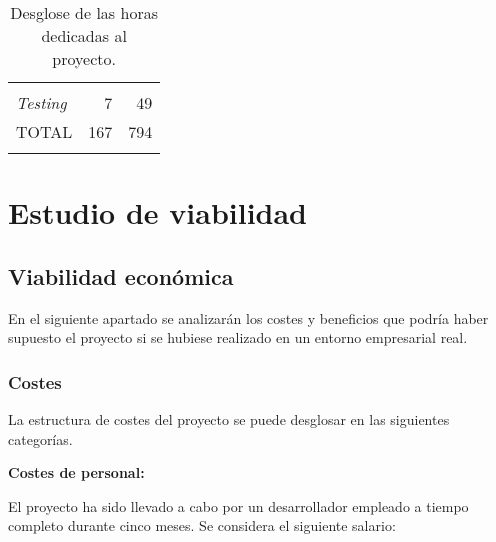 \begin{longtable}[]{@{}lrr@{}}
\begin{minipage}[t]{0.19\columnwidth}
\end{minipage}\tabularnewline
\begin{minipage}[t]{0.37\columnwidth}\raggedright\strut
\emph{Testing}\strut
\end{minipage} & \begin{minipage}[t]{0.19\columnwidth}\raggedright\strut
7\strut
\end{minipage} & \begin{minipage}[t]{0.19\columnwidth}\raggedright\strut
49\strut
\end{minipage}\tabularnewline
\midrule
\begin{minipage}[t]{0.37\columnwidth}\raggedright\strut
TOTAL\strut
\end{minipage} & \begin{minipage}[t]{0.19\columnwidth}\raggedright\strut
167\strut
\end{minipage} & \begin{minipage}[t]{0.19\columnwidth}\raggedright\strut
794\strut
\end{minipage}\tabularnewline
\bottomrule
\caption{Desglose de las horas dedicadas al proyecto.}
\end{longtable}

\newpage
\section{Estudio de viabilidad}\label{estudio-de-viabilidad}

\subsection{Viabilidad económica}\label{viabilidad-econuxf3mica}

En el siguiente apartado se analizarán los costes y beneficios que
podría haber supuesto el proyecto si se hubiese realizado en un entorno
empresarial real.

\subsubsection{Costes}\label{costes}

La estructura de costes del proyecto se puede desglosar en las
siguientes categorías.

\textbf{Costes de personal:}

El proyecto ha sido llevado a cabo por un desarrollador empleado a
tiempo completo durante cinco meses. Se considera el siguiente salario:

